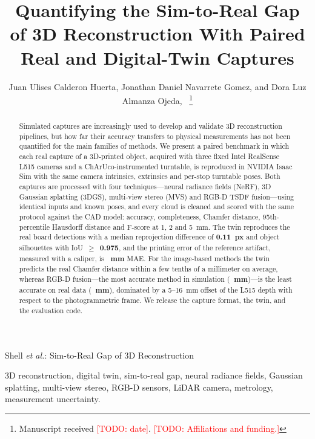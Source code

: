 \documentclass[journal]{IEEEtran}
\newcommand{\todo}[1]{\textcolor{red}{[TODO: #1]}}
\begin{document}
\title{Quantifying the Sim-to-Real Gap of 3D Reconstruction With Paired Real and Digital-Twin Captures}

\author{Juan Ulises Calderon Huerta, Jonathan Daniel Navarrete Gomez,
        and Dora Luz Almanza Ojeda,~%
\thanks{Manuscript received \todo{date}. \todo{Affiliations and funding.}}}

%
{Shell \MakeLowercase{\textit{et al.}}: Sim-to-Real Gap of 3D Reconstruction}

\maketitle

\begin{abstract}
Simulated captures are increasingly used to develop and validate 3D reconstruction pipelines, but how far
their accuracy transfers to physical measurements has not been quantified for the main families of methods.
We present a paired benchmark in which each real capture of a 3D-printed object, acquired with three fixed
Intel RealSense L515 cameras and a ChArUco-instrumented turntable, is reproduced in NVIDIA Isaac Sim with
the same camera intrinsics, extrinsics and per-stop turntable poses. Both captures are processed with four
techniques---neural radiance fields (NeRF), 3D Gaussian splatting (3DGS), multi-view stereo (MVS) and
RGB-D TSDF fusion---using identical inputs and known poses, and every cloud is cleaned and scored with the
same protocol against the CAD model: accuracy, completeness, Chamfer distance, 95th-percentile Hausdorff
distance and F-score at 1, 2 and 5~mm. The twin reproduces the real board detections with a median
reprojection difference of \textbf{0.11~px} and object silhouettes with IoU~$\geq$~\textbf{0.975}, and the
printing error of the reference artifact, measured with a caliper, is \textbf{\printmae~mm} MAE. For the
image-based methods the twin predicts the real Chamfer distance within a few tenths of a millimeter on
average, whereas RGB-D fusion---the most accurate method in simulation (\textbf{\rgbdS~mm})---is the least
accurate on real data (\textbf{\rgbdR~mm}), dominated by a 5--16~mm offset of the L515 depth with respect
to the photogrammetric frame. We release the capture format, the twin, and the evaluation code.
\end{abstract}

\begin{IEEEkeywords}
3D reconstruction, digital twin, sim-to-real gap, neural radiance fields, Gaussian splatting, multi-view
stereo, RGB-D sensors, LiDAR camera, metrology, measurement uncertainty.
\end{IEEEkeywords}
\end{document}
